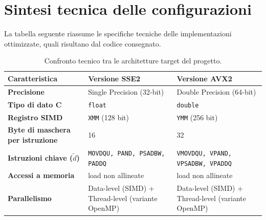 \newpage
\section{Sintesi tecnica delle configurazioni}
La tabella seguente riassume le specifiche tecniche delle implementazioni ottimizzate, quali risultano dal codice consegnato.

\begin{table}[h!]
\centering
\small
\renewcommand{\arraystretch}{1.5}
\begin{tabularx}{\textwidth}{|l|X|X|}
\hline
\textbf{Caratteristica} & \textbf{Versione SSE2} & \textbf{Versione AVX2} \\ \hline
\textbf{Precisione} & Single Precision (32-bit) & Double Precision (64-bit) \\ \hline
\textbf{Tipo di dato C} & \texttt{float} & \texttt{double} \\ \hline
\textbf{Registro SIMD} & \texttt{XMM} (128 bit) & \texttt{YMM} (256 bit) \\ \hline
\textbf{Byte di maschera per istruzione} & 16 & 32 \\ \hline
\textbf{Istruzioni chiave ($\tilde{d}$)} & \texttt{MOVDQU, PAND, PSADBW, PADDQ} & \texttt{VMOVDQU, VPAND, VPSADBW, VPADDQ} \\ \hline
\textbf{Accessi a memoria} & load non allineate & load non allineate \\ \hline
\textbf{Parallelismo} & Data-level (SIMD) + Thread-level (variante OpenMP) & Data-level (SIMD) + Thread-level (variante OpenMP) \\ \hline
\end{tabularx}
\caption{Confronto tecnico tra le architetture target del progetto.}
\end{table}
